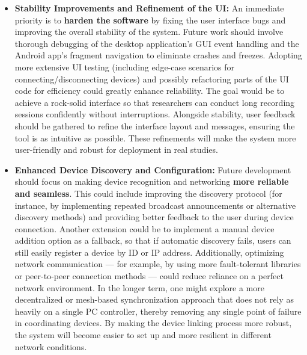 \documentclass[11pt,a4paper]{report}
\begin{document}
\begin{itemize}
\item \textbf{Stability Improvements and Refinement of the UI:} An immediate
  priority is to \textbf{harden the software} by fixing the user interface
  bugs and improving the overall stability of the system. Future work
  should involve thorough debugging of the desktop application's GUI
  event handling and the Android app's fragment navigation to eliminate
  crashes and freezes. Adopting more extensive UI testing (including
  edge-case scenarios for connecting/disconnecting devices) and possibly
  refactoring parts of the UI code for efficiency could greatly enhance
  reliability. The goal would be to achieve a rock-solid interface so
  that researchers can conduct long recording sessions confidently
  without interruptions. Alongside stability, user feedback should be
  gathered to refine the interface layout and messages, ensuring the
  tool is as intuitive as possible. These refinements will make the
  system more user-friendly and robust for deployment in real studies.

\item \textbf{Enhanced Device Discovery and Configuration:} Future development
  should focus on making device recognition and networking \textbf{more
  reliable and seamless}. This could include improving the discovery
  protocol (for instance, by implementing repeated broadcast
  announcements or alternative discovery methods) and providing better
  feedback to the user during device connection. Another extension could
  be to implement a manual device addition option as a fallback, so that
  if automatic discovery fails, users can still easily register a device
  by ID or IP address. Additionally, optimizing network communication ---
  for example, by using more fault-tolerant libraries or peer-to-peer
  connection methods --- could reduce reliance on a perfect network
  environment. In the longer term, one might explore a more
  decentralized or mesh-based synchronization approach that does not
  rely as heavily on a single PC controller, thereby removing any single
  point of failure in coordinating devices. By making the device linking
  process more robust, the system will become easier to set up and more
  resilient in different network conditions.


\end{itemize}
\end{document}
